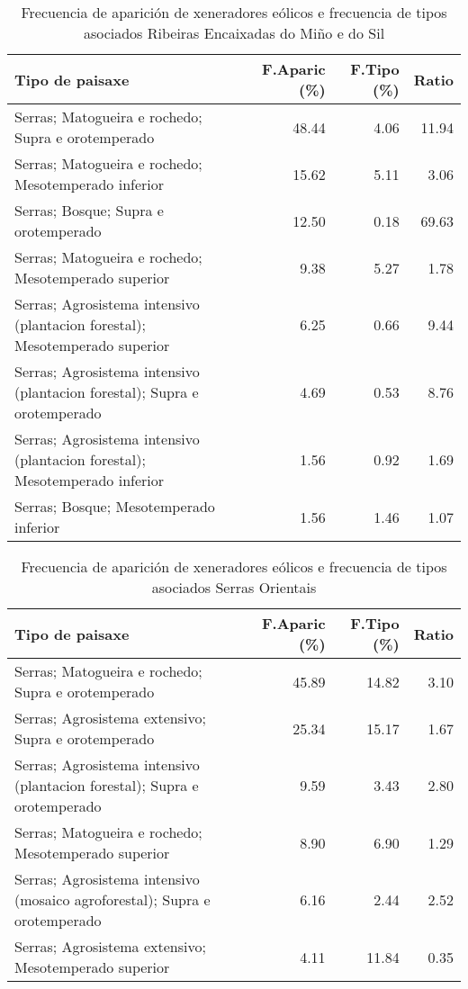 \begin{table}[p]
\centering
\caption{Frecuencia de aparición de xeneradores eólicos e frecuencia de tipos asociados Ribeiras Encaixadas do Miño e do Sil} 
\label{veolico4}
\begin{tabular}{lrrr}
  \hline
Tipo de paisaxe & F.Aparic (\%) & F.Tipo (\%) & Ratio \\ 
  \hline
Serras; Matogueira e rochedo; Supra e orotemperado & 48.44 & 4.06 & 11.94 \\ 
  Serras; Matogueira e rochedo; Mesotemperado inferior & 15.62 & 5.11 & 3.06 \\ 
  Serras; Bosque; Supra e orotemperado & 12.50 & 0.18 & 69.63 \\ 
  Serras; Matogueira e rochedo; Mesotemperado superior & 9.38 & 5.27 & 1.78 \\ 
  Serras; Agrosistema intensivo (plantacion forestal); Mesotemperado superior & 6.25 & 0.66 & 9.44 \\ 
  Serras; Agrosistema intensivo (plantacion forestal); Supra e orotemperado & 4.69 & 0.53 & 8.76 \\ 
  Serras; Agrosistema intensivo (plantacion forestal); Mesotemperado inferior & 1.56 & 0.92 & 1.69 \\ 
  Serras; Bosque; Mesotemperado inferior & 1.56 & 1.46 & 1.07 \\ 
   \hline
\end{tabular}
\end{table}
\begin{table}[p]
\centering
\caption{Frecuencia de aparición de xeneradores eólicos e frecuencia de tipos asociados Serras Orientais} 
\label{veolico5}
\begin{tabular}{lrrr}
  \hline
Tipo de paisaxe & F.Aparic (\%) & F.Tipo (\%) & Ratio \\ 
  \hline
Serras; Matogueira e rochedo; Supra e orotemperado & 45.89 & 14.82 & 3.10 \\ 
  Serras; Agrosistema extensivo; Supra e orotemperado & 25.34 & 15.17 & 1.67 \\ 
  Serras; Agrosistema intensivo (plantacion forestal); Supra e orotemperado & 9.59 & 3.43 & 2.80 \\ 
  Serras; Matogueira e rochedo; Mesotemperado superior & 8.90 & 6.90 & 1.29 \\ 
  Serras; Agrosistema intensivo (mosaico agroforestal); Supra e orotemperado & 6.16 & 2.44 & 2.52 \\ 
  Serras; Agrosistema extensivo; Mesotemperado superior & 4.11 & 11.84 & 0.35 \\ 
   \hline
\end{tabular}
\end{table}
